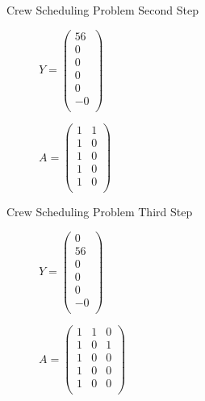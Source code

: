 \documentclass{beamer}
\begin{document}
\begin{frame}{Crew Scheduling Problem}
    Second Step
    \begin{figure}[!htb]
        \begin{minipage}{0.48\textwidth}
            \centering
            $Y = \begin{pmatrix}56\\ 0\\ 0\\ 0\\ 0\\ -0\\ \end{pmatrix}$
            \end{minipage}
        \begin{minipage}{0.48\textwidth}
            $A = \begin{pmatrix}
                1 & 1 \\
                1 & 0 \\
                1 & 0 \\
                1 & 0 \\
                1 & 0 \\
            \end{pmatrix}$
        \end{minipage}
    \end{figure}
\end{frame}

\begin{frame}{Crew Scheduling Problem}
    Third Step
    \begin{figure}[!htb]
        \begin{minipage}{0.48\textwidth}
            \centering
            $Y = \begin{pmatrix}0\\ 56\\ 0\\ 0\\ 0\\ -0\\ \end{pmatrix}$
            \end{minipage}
        \begin{minipage}{0.48\textwidth}
            $A = \begin{pmatrix}
                1 & 1 & 0 \\
                1 & 0 & 1 \\
                1 & 0 & 0 \\
                1 & 0 & 0 \\
                1 & 0 & 0 \\
            \end{pmatrix}$
        \end{minipage}
    \end{figure}
\end{frame}
\end{document}
